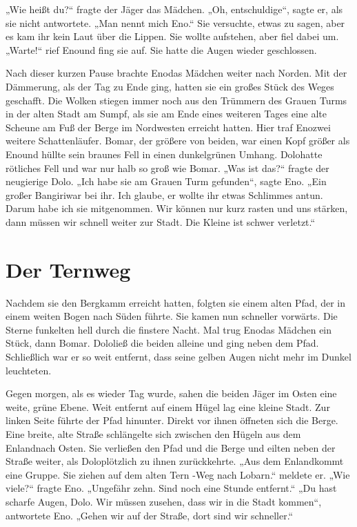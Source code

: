 \documentclass[12pt,a4paper,onecolumn,twoside,ngerman]{book}
\newcommand{\Tern}{Tern }
\newcommand{\Bangiri}{Bangiri}
\newcommand{\Enland}{Enland}
\newcommand{\Schattenjager}{Schattenläufer}
\newcommand{\Eno}{Eno}
\newcommand{\Bomar}{Bomar}
\newcommand{\Do}{Dolo}
\newcommand{\Lobarn}{Lobarn}
\begin{document}
„Wie heißt du?“ fragte der Jäger das Mädchen. „Oh, entschuldige“, sagte er, als sie nicht antwortete. „Man nennt mich \Eno.“ Sie versuchte, etwas zu sagen, aber es kam ihr kein Laut über die Lippen. Sie wollte aufstehen, aber fiel dabei um. „Warte!“ rief \Eno und fing sie auf. Sie hatte die Augen wieder geschlossen.

Nach dieser kurzen Pause brachte \Eno das Mädchen weiter nach Norden. Mit der Dämmerung, als der Tag zu Ende ging, hatten sie ein großes Stück des Weges geschafft. Die Wolken stiegen immer noch aus den Trümmern des Grauen Turms in der alten Stadt am Sumpf, als sie am Ende eines weiteren Tages eine alte Scheune am Fuß der Berge im Nordwesten erreicht hatten. Hier traf \Eno zwei weitere \Schattenjager. \Bomar, der größere von beiden, war einen Kopf größer als \Eno und hüllte sein braunes Fell in einen dunkelgrünen Umhang. \Do hatte rötliches Fell und war nur halb so groß wie \Bomar. 
„Was ist das?“ fragte der neugierige \Do. 
„Ich habe sie am Grauen Turm gefunden“, sagte \Eno. „Ein großer \Bangiri war bei ihr. Ich glaube, er wollte ihr etwas Schlimmes antun. Darum habe ich sie mitgenommen. Wir können nur kurz rasten und uns stärken, dann müssen wir schnell weiter zur Stadt. Die Kleine ist schwer verletzt.“

\section{Der Ternweg}
Nachdem sie den Bergkamm erreicht hatten, folgten sie einem alten Pfad, der in einem weiten Bogen nach Süden führte. Sie kamen nun schneller vorwärts. Die Sterne funkelten hell durch die finstere Nacht. Mal trug \Eno das Mädchen ein Stück, dann \Bomar. \Do ließ die beiden alleine und ging neben dem Pfad. Schließlich war er so weit entfernt, dass seine gelben Augen nicht mehr im Dunkel leuchteten.

Gegen morgen, als es wieder Tag wurde, sahen die beiden Jäger im Osten eine weite, grüne Ebene. Weit entfernt auf einem Hügel lag eine kleine Stadt. Zur linken Seite führte der Pfad hinunter. Direkt vor ihnen öffneten sich die Berge. Eine breite, alte Straße schlängelte sich zwischen den Hügeln aus dem \Enland nach Osten. Sie verließen den Pfad und die Berge und eilten neben der Straße weiter, als \Do plötzlich zu ihnen zurückkehrte. „Aus dem \Enland kommt eine Gruppe. Sie ziehen auf dem alten \Tern{-Weg} nach \Lobarn.“ meldete er. „Wie viele?“ fragte \Eno. „Ungefähr zehn. Sind noch eine Stunde entfernt.“ „Du hast scharfe Augen, \Do. Wir müssen zusehen, dass wir in die Stadt kommen“, antwortete \Eno. „Gehen wir auf der Straße, dort sind wir schneller.“
\end{document}
